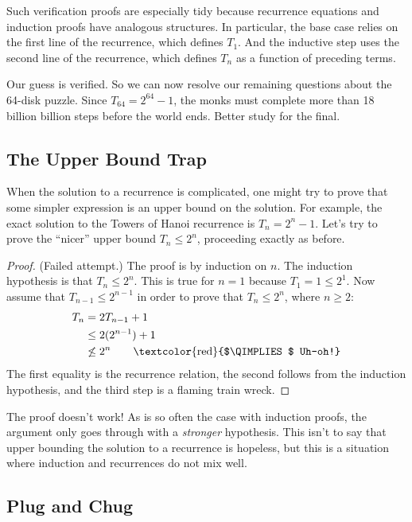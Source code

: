 Such verification proofs are especially tidy because recurrence
equations and induction proofs have analogous structures.  In
particular, the base case relies on the first line of the recurrence,
which defines $T_1$.  And the inductive step uses the second line of
the recurrence, which defines $T_n$ as a function of preceding terms.

Our guess is verified.  So we can now resolve our remaining questions
about the 64-disk puzzle.  Since $T_{64} = 2^{64} - 1$, the monks must
complete more than 18 billion billion steps before the world ends.
Better study for the final.

\subsection{The Upper Bound Trap}

When the solution to a recurrence is complicated, one might try to
prove that some simpler expression is an upper bound on the solution.
For example, the exact solution to the Towers of Hanoi recurrence is
$T_n = 2^n - 1$.  Let's try to prove the ``nicer'' upper bound $T_n
\leq 2^n$, proceeding exactly as before.

\begin{proof} (Failed attempt.)
  The proof is by induction on $n$.  The induction hypothesis is that
  $T_n \leq 2^n$.  This is true for $n = 1$ because $T_1 = 1 \leq 2^1$.
  Now assume that $T_{n-1} \leq 2^{n-1}$ in order to prove that $T_n
  \leq 2^n$, where $n \geq 2$:
\begin{align*}
T_n & = 2 T_{n-1} + 1 \\ & \leq 2 (2^{n-1}) + 1 \\ & \not\leq 2^n
\qquad \text{\textcolor{red}{$\QIMPLIES$ Uh-oh!}}
\end{align*}
The first equality is the recurrence relation, the second follows from
the induction hypothesis, and the third step is a flaming train wreck.
\end{proof}

The proof doesn't work!  As is so often the case with induction
proofs, the argument only goes through with a \emph{stronger}
hypothesis.  This isn't to say that upper bounding the solution to a
recurrence is hopeless, but this is a situation where induction and
recurrences do not mix well.

\subsection{Plug and Chug}

